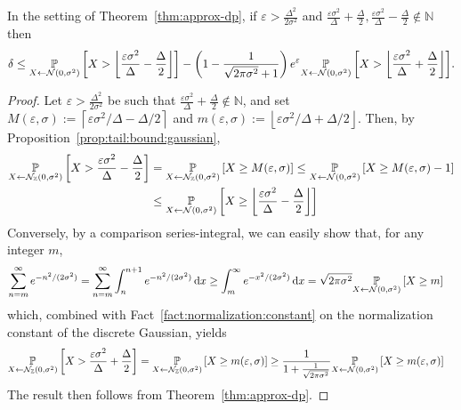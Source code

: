 \documentclass{jpc}
\newcommand{\dgausss}[2]{{\discN\left(#1,#2\right)}}
\newcommand{\dgauss}[1]{\dgausss{0}{#1}}
\newcommand{\pr}[2]{{\ifx&#1& \mathbb{P} \else
\underset{#1}{\mathbb{P}} \fi \left[#2\right]}}
\newcommand{\eqdef}{:=}
\newcommand{\eps}{\varepsilon}
\newcommand{\dx}[1][x]{\mathrm{d}#1}
\begin{document}
\begin{lem}
In the setting of Theorem~\ref{thm:approx-dp}, if $\eps > \frac{\Delta^2}{2\sigma^2}$ and $\frac{\eps\sigma^2}{\Delta}+\frac{\Delta}{2},\frac{\eps\sigma^2}{\Delta}-\frac{\Delta}{2}\notin \mathbb{N}$ then
\begin{equation}
\delta \le \pr{X \gets \mathcal{N}(0,\sigma^2)}{ X > \left\lfloor \frac{\eps\sigma^2}{\Delta}-\frac{\Delta}{2} \right\rfloor }-\left(1-\frac{1}{\sqrt{2\pi\sigma^2}+1}\right)e^\eps\pr{X \gets \mathcal{N}(0,\sigma^2)}{X > \left\lfloor \frac{\eps\sigma^2}{\Delta}+\frac{\Delta}{2} \right\rfloor }.
\end{equation}
\end{lem}
\begin{proof}
Let $\eps > \frac{\Delta^2}{2\sigma^2}$ be such that $\frac{\eps\sigma^2}{\Delta}+\frac{\Delta}{2}\notin \mathbb{N}$, and set $M(\eps,\sigma) \eqdef \left\lceil {\eps\sigma^2}/{\Delta}-{\Delta}/{2} \right\rceil$ and $m(\eps,\sigma) \eqdef \left\lfloor {\eps\sigma^2}/{\Delta}+{\Delta}/{2} \right\rfloor$. Then, by Proposition~\ref{prop:tail:bound:gaussian},
\begin{align*}
    \pr{X \gets \dgauss{\sigma^2}}{ X > \frac{\eps\sigma^2}{\Delta}-\frac{\Delta}{2} }
    &= \pr{X \gets \dgauss{\sigma^2}}{ X \geq M(\eps,\sigma) }
    \leq \pr{X \gets \mathcal{N}(0,\sigma^2)}{ X \geq M(\eps,\sigma)-1 } \\
    &\leq \pr{X \gets \mathcal{N}(0,\sigma^2)}{ X \geq \left\lfloor \frac{\eps\sigma^2}{\Delta}-\frac{\Delta}{2} \right\rfloor }
\end{align*}
Conversely, by a comparison series-integral, we can easily show that, for any integer $m$,
\begin{align*}
\sum_{n=m}^\infty e^{-n^2/(2\sigma^2)}
&= \sum_{n=m}^\infty \int_{n}^{n+1} e^{-n^2/(2\sigma^2)}\,\dx
\geq \int_{m}^\infty e^{-x^2/(2\sigma^2)}\,\dx
= \sqrt{2\pi\sigma^2}\pr{X \gets \mathcal{N}(0,\sigma^2)}{ X \geq m }
\end{align*}
which, combined with Fact~\ref{fact:normalization:constant} on the normalization constant of the discrete Gaussian, yields
\begin{align*}
    \pr{X \gets \dgauss{\sigma^2}}{ X > \frac{\eps\sigma^2}{\Delta}+\frac{\Delta}{2} }
    &= \pr{X \gets \dgauss{\sigma^2}}{ X \geq m(\eps,\sigma) }
    \geq \frac{1}{1+\frac{1}{\sqrt{2\pi\sigma^2}}}\pr{X \gets \mathcal{N}(0,\sigma^2)}{ X \geq m(\eps,\sigma) }
\end{align*}
The result then follows from Theorem~\ref{thm:approx-dp}.
\end{proof}
\end{document}
